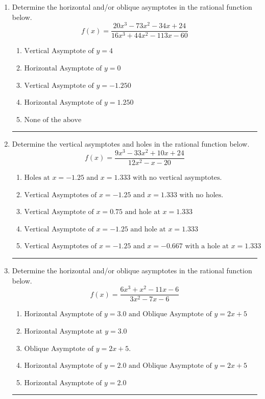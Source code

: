 \documentclass[14pt]{extbook}
\newcommand{\litem}[1]{\item#1\hspace*{-1cm}\rule{\textwidth}{0.4pt}}
\begin{document}
\begin{enumerate}
{\begin{enumerate}[label=\Alph*.]
\end{enumerate} }
\litem{
Determine the horizontal and/or oblique asymptotes in the rational function below.\[ f(x) = \frac{20x^{3} -73 x^{2} -34 x + 24}{16x^{3} +44 x^{2} -113 x -60} \]\begin{enumerate}[label=\Alph*.]
\item \( \text{Vertical Asymptote of } y = 4  \)
\item \( \text{Horizontal Asymptote of } y = 0  \)
\item \( \text{Vertical Asymptote of } y = -1.250  \)
\item \( \text{Horizontal Asymptote of } y = 1.250  \)
\item \( \text{None of the above} \)

\end{enumerate} }
\litem{
Determine the vertical asymptotes and holes in the rational function below.\[ f(x) = \frac{9x^{3} -33 x^{2} +10 x + 24}{12x^{2} -x -20} \]\begin{enumerate}[label=\Alph*.]
\item \( \text{Holes at } x = -1.25 \text{ and } x = 1.333 \text{ with no vertical asymptotes.} \)
\item \( \text{Vertical Asymptotes of } x = -1.25 \text{ and } x = 1.333 \text{ with no holes.} \)
\item \( \text{Vertical Asymptote of } x = 0.75 \text{ and hole at } x = 1.333 \)
\item \( \text{Vertical Asymptote of } x = -1.25 \text{ and hole at } x = 1.333 \)
\item \( \text{Vertical Asymptotes of } x = -1.25 \text{ and } x = -0.667 \text{ with a hole at } x = 1.333 \)

\end{enumerate} }
\litem{
Determine the horizontal and/or oblique asymptotes in the rational function below.\[ f(x) = \frac{6x^{3} + x^{2} -11 x -6}{3x^{2} -7 x -6} \]\begin{enumerate}[label=\Alph*.]
\item \( \text{Horizontal Asymptote of } y = 3.0 \text{ and Oblique Asymptote of } y = 2x + 5 \)
\item \( \text{Horizontal Asymptote at } y = 3.0 \)
\item \( \text{Oblique Asymptote of } y = 2x + 5. \)
\item \( \text{Horizontal Asymptote of } y = 2.0 \text{ and Oblique Asymptote of } y = 2x + 5 \)
\item \( \text{Horizontal Asymptote of } y = 2.0  \)


\end{enumerate}}
\end{enumerate}
\end{document}
